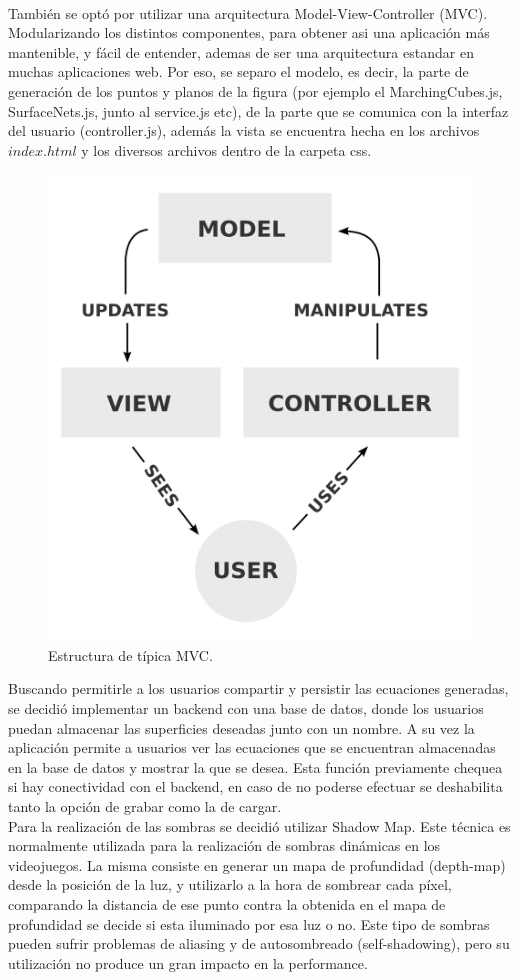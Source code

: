 \documentclass[12pt]{article}
\begin{document}
\\También se optó por utilizar una arquitectura Model-View-Controller (MVC). Modularizando los distintos componentes, para obtener asi una aplicación más mantenible, y fácil de entender, ademas de ser una arquitectura estandar en muchas aplicaciones web. Por eso, se separo el modelo, es decir, la parte de generación de los puntos y planos de la figura (por ejemplo el MarchingCubes.js, SurfaceNets.js, junto al service.js etc), de la parte que se comunica con la interfaz del usuario (controller.js), además la vista se encuentra hecha en los archivos $index.html$ y los diversos archivos dentro de la carpeta css.
\clearpage
\begin{figure}[h!]
\includegraphics[width =0.4\linewidth, center]{mvc.png}
\caption{Estructura de típica MVC.}
\label{ fig : surface }
\end{figure}
Buscando permitirle a los usuarios compartir y persistir las ecuaciones generadas, se decidió implementar un backend con una base de datos, donde los usuarios puedan almacenar las superficies deseadas junto con un nombre. A su vez la aplicación permite a usuarios ver las ecuaciones que se encuentran almacenadas en la base de datos y mostrar la que se desea. Esta función previamente chequea si hay conectividad con el backend, en caso de no poderse efectuar se deshabilita tanto la opción de grabar como la de cargar.
\\Para la realización de las sombras se decidió utilizar Shadow Map\cite{shadowmap}\cite{realtimerendering}. Este técnica es normalmente utilizada para la realización de sombras dinámicas en los videojuegos\cite{engine}\cite{realtimerendering}. La misma consiste en generar un mapa de profundidad (depth-map) desde la posición de la luz, y utilizarlo a la hora de sombrear cada píxel, comparando la distancia de ese punto contra la obtenida en el mapa de profundidad se decide si esta iluminado por esa luz o no. Este tipo de sombras pueden sufrir problemas de aliasing y de autosombreado (self-shadowing)\cite{realtimerendering}, pero su utilización no produce un gran impacto en la performance.
\end{document}
